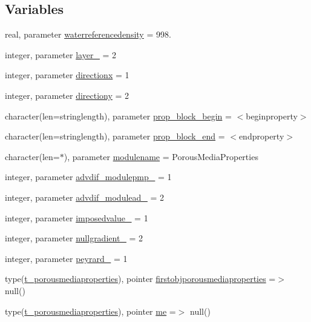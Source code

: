 \subsection*{Variables}
\begin{DoxyCompactItemize}
\item 
real, parameter \mbox{\hyperlink{namespacemoduleporousmediaproperties_a7934d23c9d533535b043423188f8010a}{waterreferencedensity}} = 998.
\item 
integer, parameter \mbox{\hyperlink{namespacemoduleporousmediaproperties_a7489983ae12c2122d5feb988c8b3ad36}{layer\+\_\+}} = 2
\item 
integer, parameter \mbox{\hyperlink{namespacemoduleporousmediaproperties_af3ed469348d3d6a26909648a47f56e8a}{directionx}} = 1
\item 
integer, parameter \mbox{\hyperlink{namespacemoduleporousmediaproperties_a2fe7588436daae719ede5ee48e9dea60}{directiony}} = 2
\item 
character(len=stringlength), parameter \mbox{\hyperlink{namespacemoduleporousmediaproperties_abc69e8111d903d795ba37cf29a05f780}{prop\+\_\+block\+\_\+begin}} = \textquotesingle{}$<$beginproperty$>$\textquotesingle{}
\item 
character(len=stringlength), parameter \mbox{\hyperlink{namespacemoduleporousmediaproperties_a7e051a4d35d9a334e59f188d76d5ef99}{prop\+\_\+block\+\_\+end}} = \textquotesingle{}$<$endproperty$>$\textquotesingle{}
\item 
character(len=$\ast$), parameter \mbox{\hyperlink{namespacemoduleporousmediaproperties_a587732ce97c9a6cb0c8330a1c0aed2f1}{modulename}} = \textquotesingle{}Porous\+Media\+Properties\textquotesingle{}
\item 
integer, parameter \mbox{\hyperlink{namespacemoduleporousmediaproperties_a71c8fa9cb77e17cfd7f683e3972580cd}{advdif\+\_\+modulepmp\+\_\+}} = 1
\item 
integer, parameter \mbox{\hyperlink{namespacemoduleporousmediaproperties_a5fb79cc3aa76009c87d9dfcace7c7ed3}{advdif\+\_\+modulead\+\_\+}} = 2
\item 
integer, parameter \mbox{\hyperlink{namespacemoduleporousmediaproperties_ab1806e49e85d996baa1b6916d45f0cc6}{imposedvalue\+\_\+}} = 1
\item 
integer, parameter \mbox{\hyperlink{namespacemoduleporousmediaproperties_af0684f3b7ac61f5d41e83cc1424d8fae}{nullgradient\+\_\+}} = 2
\item 
integer, parameter \mbox{\hyperlink{namespacemoduleporousmediaproperties_a1e67fec3a9035dcb908daca2f464ffe0}{peyrard\+\_\+}} = 1
\item 
type(\mbox{\hyperlink{structmoduleporousmediaproperties_1_1t__porousmediaproperties}{t\+\_\+porousmediaproperties}}), pointer \mbox{\hyperlink{namespacemoduleporousmediaproperties_ab44e9a984567630770ebd718383594a7}{firstobjporousmediaproperties}} =$>$ null()
\item 
type(\mbox{\hyperlink{structmoduleporousmediaproperties_1_1t__porousmediaproperties}{t\+\_\+porousmediaproperties}}), pointer \mbox{\hyperlink{namespacemoduleporousmediaproperties_af14bc4d911a57505bd2db9b85e475b08}{me}} =$>$ null()
\end{DoxyCompactItemize}



